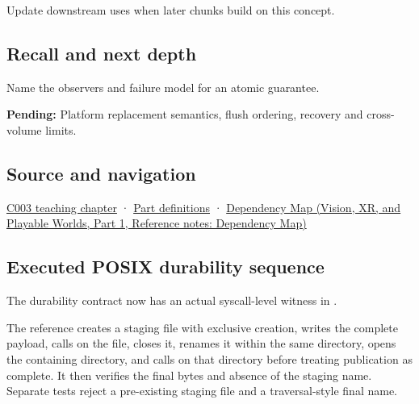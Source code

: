 \hypertarget{appendix-e89a8f290ef5-used-by}{}

Update downstream uses when later chunks build on this concept.

\subsection{Recall and next depth}\label{appendix-e89a8f290ef5-recall-and-next-depth}

\hypertarget{appendix-e89a8f290ef5-recall-and-next-depth}{}

Name the observers and failure model for an atomic guarantee.

\textbf{Pending:} Platform replacement semantics, flush ordering, recovery and cross-volume limits.

\subsection{Source and navigation}\label{appendix-e89a8f290ef5-source-and-navigation}

\hypertarget{appendix-e89a8f290ef5-source-and-navigation}{}

\hyperref[01-foundations-i-ch002-where-the-bytes-live]{C003 teaching chapter} · \hyperref[appendix-fd090d982a15-m003---parts-41-60]{Part definitions} · \href{../07-Vision-XR-and-Playable-Worlds-P01/main.pdf\#nameddest=appendix-4ad47bdd269a}{Dependency Map (Vision, XR, and Playable Worlds, Part 1, Reference notes: Dependency Map)}

\subsection{Executed POSIX durability sequence}\label{appendix-e89a8f290ef5-executed-posix-durability-sequence}

\hypertarget{appendix-e89a8f290ef5-executed-posix-durability-sequence}{}

The durability contract now has an actual syscall-level witness in .

The reference creates a staging file with exclusive creation, writes the complete payload, calls  on the file, closes it, renames it within the same directory, opens the containing directory, and calls  on that directory before treating publication as complete. It then verifies the final bytes and absence of the staging name. Separate tests reject a pre-existing staging file and a traversal-style final name.

